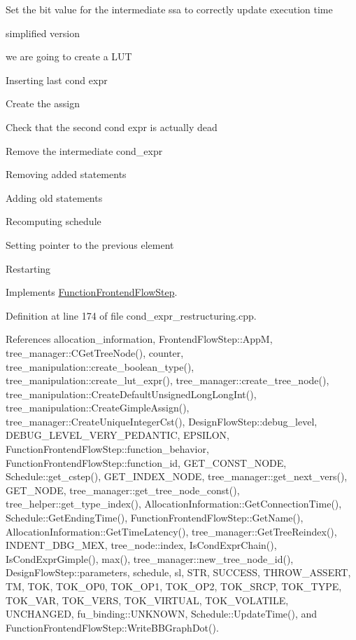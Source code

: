 Set the bit value for the intermediate ssa to correctly update execution time

simplified version

we are going to create a L\+UT

Inserting last cond expr

Create the assign

Check that the second cond expr is actually dead

Remove the intermediate cond\+\_\+expr

Removing added statements

Adding old statements

Recomputing schedule

Setting pointer to the previous element

Restarting 

Implements \hyperlink{classFunctionFrontendFlowStep_a00612f7fb9eabbbc8ee7e39d34e5ac68}{Function\+Frontend\+Flow\+Step}.



Definition at line 174 of file cond\+\_\+expr\+\_\+restructuring.\+cpp.



References allocation\+\_\+information, Frontend\+Flow\+Step\+::\+AppM, tree\+\_\+manager\+::\+C\+Get\+Tree\+Node(), counter, tree\+\_\+manipulation\+::create\+\_\+boolean\+\_\+type(), tree\+\_\+manipulation\+::create\+\_\+lut\+\_\+expr(), tree\+\_\+manager\+::create\+\_\+tree\+\_\+node(), tree\+\_\+manipulation\+::\+Create\+Default\+Unsigned\+Long\+Long\+Int(), tree\+\_\+manipulation\+::\+Create\+Gimple\+Assign(), tree\+\_\+manager\+::\+Create\+Unique\+Integer\+Cst(), Design\+Flow\+Step\+::debug\+\_\+level, D\+E\+B\+U\+G\+\_\+\+L\+E\+V\+E\+L\+\_\+\+V\+E\+R\+Y\+\_\+\+P\+E\+D\+A\+N\+T\+IC, E\+P\+S\+I\+L\+ON, Function\+Frontend\+Flow\+Step\+::function\+\_\+behavior, Function\+Frontend\+Flow\+Step\+::function\+\_\+id, G\+E\+T\+\_\+\+C\+O\+N\+S\+T\+\_\+\+N\+O\+DE, Schedule\+::get\+\_\+cstep(), G\+E\+T\+\_\+\+I\+N\+D\+E\+X\+\_\+\+N\+O\+DE, tree\+\_\+manager\+::get\+\_\+next\+\_\+vers(), G\+E\+T\+\_\+\+N\+O\+DE, tree\+\_\+manager\+::get\+\_\+tree\+\_\+node\+\_\+const(), tree\+\_\+helper\+::get\+\_\+type\+\_\+index(), Allocation\+Information\+::\+Get\+Connection\+Time(), Schedule\+::\+Get\+Ending\+Time(), Function\+Frontend\+Flow\+Step\+::\+Get\+Name(), Allocation\+Information\+::\+Get\+Time\+Latency(), tree\+\_\+manager\+::\+Get\+Tree\+Reindex(), I\+N\+D\+E\+N\+T\+\_\+\+D\+B\+G\+\_\+\+M\+EX, tree\+\_\+node\+::index, Is\+Cond\+Expr\+Chain(), Is\+Cond\+Expr\+Gimple(), max(), tree\+\_\+manager\+::new\+\_\+tree\+\_\+node\+\_\+id(), Design\+Flow\+Step\+::parameters, schedule, sl, S\+TR, S\+U\+C\+C\+E\+SS, T\+H\+R\+O\+W\+\_\+\+A\+S\+S\+E\+RT, TM, T\+OK, T\+O\+K\+\_\+\+O\+P0, T\+O\+K\+\_\+\+O\+P1, T\+O\+K\+\_\+\+O\+P2, T\+O\+K\+\_\+\+S\+R\+CP, T\+O\+K\+\_\+\+T\+Y\+PE, T\+O\+K\+\_\+\+V\+AR, T\+O\+K\+\_\+\+V\+E\+RS, T\+O\+K\+\_\+\+V\+I\+R\+T\+U\+AL, T\+O\+K\+\_\+\+V\+O\+L\+A\+T\+I\+LE, U\+N\+C\+H\+A\+N\+G\+ED, fu\+\_\+binding\+::\+U\+N\+K\+N\+O\+WN, Schedule\+::\+Update\+Time(), and Function\+Frontend\+Flow\+Step\+::\+Write\+B\+B\+Graph\+Dot().

